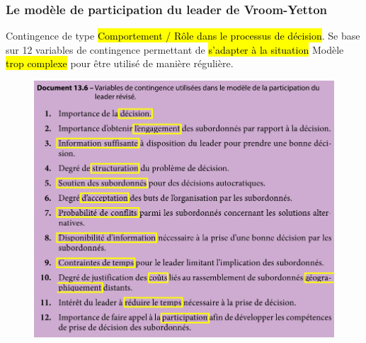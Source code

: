 \documentclass[letterpaper, 12pt]{article}
\newcommand{\alinea}{
\hspace*{0.3cm}}
\begin{document}
		\subsubsection{Le modèle de participation du leader de Vroom-Yetton}
			\alinea Contingence de type \hl{Comportement / R\^ole dans le processus de d\'ecision}. 
			Se base sur 12 variables de contingence permettant de \hl{s'adapter \`a la situation}
			Modèle \hl{trop complexe} pour être utilisé de manière régulière.
			\begin{figure}[H]
				\centering
				\includegraphics[scale=0.75]{Images/participation}
			\end{figure}\noindent
\end{document}
